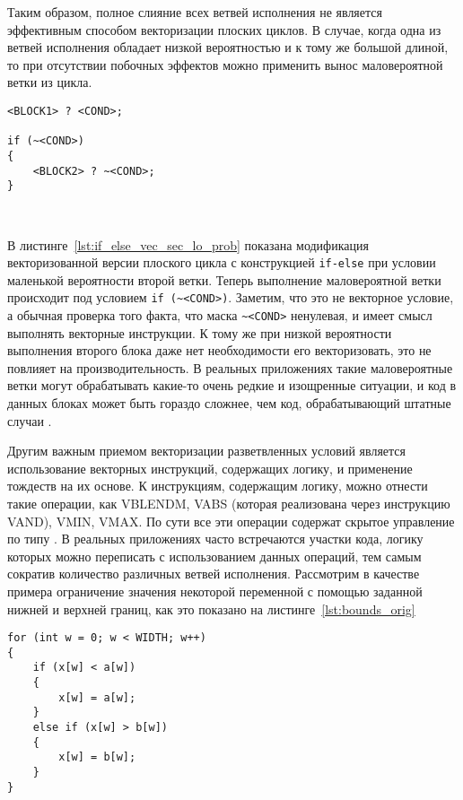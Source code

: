 \documentclass[
11pt,%
tightenlines,%
twoside,%
onecolumn,%
nofloats,%
nobibnotes,%
nofootinbib,%
superscriptaddress,%
noshowpacs,%
centertags]%
{revtex4}
\begin{document}
Таким образом, полное слияние всех ветвей исполнения не является эффективным способом векторизации плоских циклов.
В случае, когда одна из ветвей исполнения обладает низкой вероятностью и к тому же большой длиной, то при отсутствии побочных эффектов можно применить вынос маловероятной ветки из цикла.

\begin{lstlisting}[caption={Векторизованная конструкция \texttt{if-else} с маловероятной второй веткой.},label={lst:if_else_vec_sec_lo_prob}]
<BLOCK1> ? <COND>;

if (~<COND>)
{
    <BLOCK2> ? ~<COND>;
}
\end{lstlisting}

\

В листинге~\ref{lst:if_else_vec_sec_lo_prob} показана модификация векторизованной версии плоского цикла с конструкцией \texttt{if-else} при условии маленькой вероятности второй ветки.
Теперь выполнение маловероятной ветки происходит под условием \texttt{if (\~{}<COND>)}.
Заметим, что это не векторное условие, а обычная проверка того факта, что маска \texttt{\~{}<COND>} ненулевая, и имеет смысл выполнять векторные инструкции.
К тому же при низкой вероятности выполнения второго блока даже нет необходимости его векторизовать, это не повлияет на производительность.
В реальных приложениях такие маловероятные ветки могут обрабатывать какие-то очень редкие и изощренные ситуации, и код в данных блоках может быть гораздо сложнее, чем код, обрабатывающий штатные случаи \cite{Rybakov_Aircraft}.

Другим важным приемом векторизации разветвленных условий является использование векторных инструкций, содержащих логику, и применение тождеств на их основе.
К инструкциям, содержащим логику, можно отнести такие операции, как VBLENDM, VABS (которая реализована через инструкцию VAND), VMIN, VMAX.
По сути все эти операции содержат скрытое управление по типу .
В реальных приложениях часто встречаются участки кода, логику которых можно переписать с использованием данных операций, тем самым сократив количество различных ветвей исполнения.
Рассмотрим в качестве примера ограничение значения некоторой переменной с помощью заданной нижней и верхней границ, как это показано на листинге~\ref{lst:bounds_orig}

\begin{lstlisting}[caption={Ограничение значения величины с помощью нижней и верхней границ.},label={lst:bounds_orig}]
for (int w = 0; w < WIDTH; w++)
{
    if (x[w] < a[w])
    {
        x[w] = a[w];
    }
    else if (x[w] > b[w])
    {
        x[w] = b[w];
    }
}
\end{lstlisting}
\end{document}
